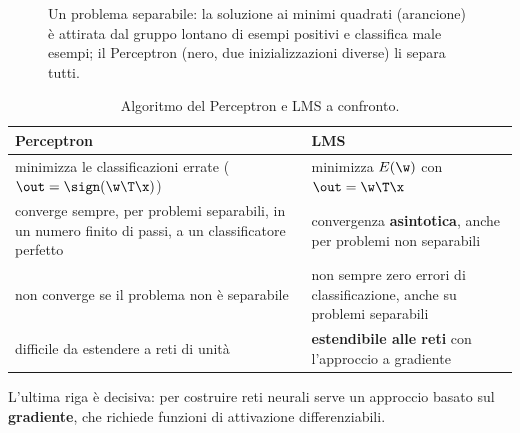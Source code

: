 \begin{figure}[ht]
\centering
{}
\caption{Un problema separabile: la soluzione ai minimi quadrati (arancione) è attirata dal gruppo lontano di
esempi positivi e classifica male \valplErrLS{} esempi; il Perceptron (nero, due inizializzazioni diverse) li
separa tutti.}
\label{fig:lms-perceptron}
\end{figure}

\begin{table}[ht]
\centering\small
\caption{Algoritmo del Perceptron e LMS a confronto.}
\begin{tabularx}{0.95\linewidth}{XX}
\toprule
Perceptron & LMS \\
\midrule
minimizza le classificazioni errate ($\out = \sign(\w\T\x)$) & minimizza $E(\w)$ con $\out = \w\T\x$ \\
converge sempre, per problemi separabili, in un numero finito di passi, a un classificatore perfetto & convergenza \textbf{asintotica}, anche per problemi non separabili \\
non converge se il problema non è separabile & non sempre zero errori di classificazione, anche su problemi separabili \\
difficile da estendere a reti di unità & \textbf{estendibile alle reti} con l'approccio a gradiente \\
\bottomrule
\end{tabularx}
\end{table}

L'ultima riga è decisiva: per costruire reti neurali serve un approccio basato sul \textbf{gradiente}, che
richiede funzioni di attivazione differenziabili.

